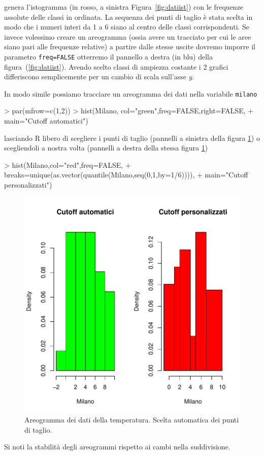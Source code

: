 \documentclass[onecolumn,12pt]{book}
\begin{document}
genera l'istogramma (in rosso, a sinistra Figura~\ref{fig:datiist}) con le frequenze assolute delle classi in ordinata. La sequenza dei punti di taglio \`e stata scelta in modo che i numeri interi da 1 a 6 siano al centro delle classi corrispondenti. Se invece volessimo creare un areogramma  (ossia avere un tracciato per cui le aree siano pari alle frequenze relative) a partire dalle stesse uscite dovremo imporre il parametro \texttt{freq=FALSE} otterremo il pannello a destra (in blu) della figura~(\ref{fig:datiist}). Avendo scelto classi di ampiezza costante i 2 grafici differiscono semplicemente per un cambio di scala sull'asse $y$.

In modo simile possiamo tracciare un areogramma  dei dati nella variabile \texttt{milano}
\begin{Schunk}
\begin{Sinput}
> par(mfrow=c(1,2))
> hist(Milano, col="green",freq=FALSE,right=FALSE,
+ main="Cutoff automatici")
\end{Sinput}
\end{Schunk}
lasciando \textsf{R} libero di scegliere i punti di taglio (pannelli a sinistra della figura \ref{fig:datiistmilano}) o scegliendoli a nostra volta (pannelli a destra della stessa figura  \ref{fig:datiistmilano})
\begin{Schunk}
\begin{Sinput}
> hist(Milano,col="red",freq=FALSE,
+ breaks=unique(as.vector(quantile(Milano,seq(0,1,by=1/6)))),
+ main="Cutoff personalizzati")
\end{Sinput}
\end{Schunk}
\begin{figure}[htbp]
\begin{center}
\includegraphics{RbookParte2-041}
\caption{ Areogramma dei dati della temperatura. Scelta automatica dei punti di taglio.}
\label{fig:datiistmilano}
\end{center}
\end{figure}
Si noti la stabilit\`a degli areogrammi rispetto ai cambi nella suddivisione.
\end{document}
